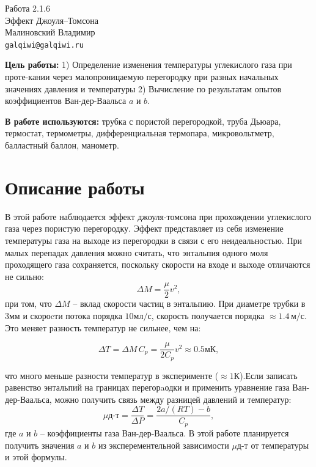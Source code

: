 \usepackage{booktabs}



\begin{center}
  \LARGE{Работа 2.1.6}\\[0.2cm]
  \LARGE{Эффект Джоуля–Томсона}\\[0.2cm]
  \large{Малиновский Владимир}\\[0.2cm]
  \normalsize{\texttt{galqiwi@galqiwi.ru}}
\end{center}

\textbf{Цель работы:} 1) Определение изменения температуры углекислого газа при проте-кании через малопроницаемую перегородку при разных начальных значениях давления и температуры 2) Вычисление по результатам опытов коэффициентов Ван-дер-Ваальса $a$ и $b$.

\textbf{В работе используются:} трубка с пористой перегородкой, труба Дьюара, термостат, термометры, дифференциальная термопара, микровольтметр, балластный баллон, манометр.

\section*{Описание работы}

В этой работе наблюдается эффект джоуля-томсона при прохождении углекислого газа через пористую перегородку. Эффект представляет из себя изменение температуры газа на выходе из перегородки в связи с его неидеальностью. При малых перепадах давления можно считать, что энтальпия одного моля проходящего газа сохраняется, поскольку скорости на входе и выходе отличаются не сильно:
$$\Delta M=\frac{\mu}{2} v^2,$$
при том, что $\Delta M$ -- вклад скорости частиц в энтальпию. При диаметре трубки в $3\text{мм}$ и скороcти потока порядка $10\text{мл}/\text{с}$, скорость получается порядка $\approx 1.4\,\text{м}/\text{с}$. Это меняет разность температур не сильнее, чем на:

$$\Delta T=\Delta M\,C_p=\frac{\mu}{2C_p}v^2\approx0.5\text{мК},$$

что много меньше разности температур в эксперименте ($\approx1\text{К}$).Если записать равенство энтальпий на границах перегорaодки и применить уравнение газа Ван-дер-Ваальса, можно получить связь между разницей давлений и температур:
$$\mu\text{д-т} = \frac{\Delta T}{\Delta P} = \frac{2a/(RT) - b}{C_p},$$
где $a$ и $b$ -- коэффициенты газа Ван-дер-Ваальса. В этой работе планируется получить значения $a$ и $b$ из эксперементельной зависимости $\mu\text{д-т}$ от температуры и этой формулы.

